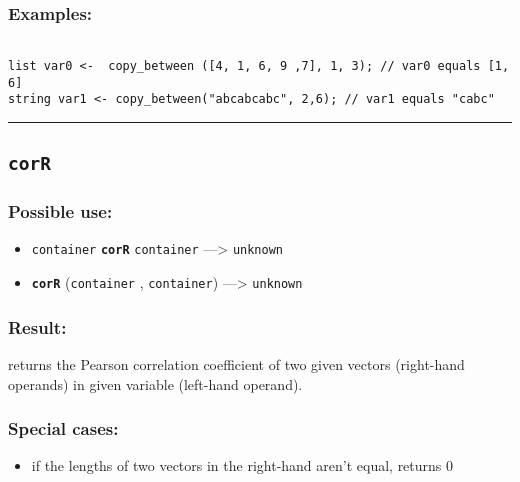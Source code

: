 \documentclass[]{book}
\providecommand{\tightlist}{%
  \setlength{\itemsep}{0pt}\setlength{\parskip}{0pt}}
\theoremstyle{definition}
\theoremstyle{definition}
\theoremstyle{definition}
\theoremstyle{remark}
\begin{document}
\subsubsection{Examples:}\label{examples-82}

\begin{verbatim}
 
list var0 <-  copy_between ([4, 1, 6, 9 ,7], 1, 3); // var0 equals [1, 6] 
string var1 <- copy_between("abcabcabc", 2,6); // var1 equals "cabc"
\end{verbatim}

\begin{center}\rule{0.5\linewidth}{\linethickness}\end{center}

\subsection{\texorpdfstring{\texttt{corR}}{corR}}\label{corr}

\subsubsection{Possible use:}\label{possible-use-108}

\begin{itemize}
\tightlist
\item
  \texttt{container} \textbf{\texttt{corR}} \texttt{container}
  ---\textgreater{} \texttt{unknown}
\item
  \textbf{\texttt{corR}} (\texttt{container} , \texttt{container})
  ---\textgreater{} \texttt{unknown}
\end{itemize}

\subsubsection{Result:}\label{result-105}

returns the Pearson correlation coefficient of two given vectors
(right-hand operands) in given variable (left-hand operand).

\subsubsection{Special cases:}\label{special-cases-38}

\begin{itemize}
\tightlist
\item
  if the lengths of two vectors in the right-hand aren't equal, returns
  0
\end{itemize}
\end{document}
